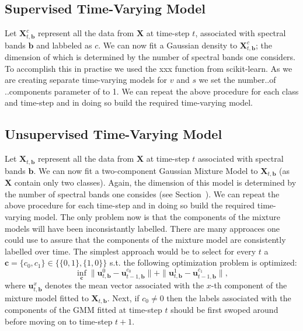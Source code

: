 \documentclass{article}
\begin{document}
\subsection{Supervised Time-Varying Model}
Let $\mathbf{X}_{t,\mathbf{b}}^c$ represent all the data from $\mathbf{X}$ at time-step $t$, associated with spectral bands $\mathbf{b}$ and labbeled as $c$. We can now fit a Gaussian density 
to $\mathbf{X}_{t,\mathbf{b}}^c$; the dimension of which is determined by the number of spectral bands one considers. To accomplish this in practise we used the xxx function from scikit-learn. 
As we are creating separate time-varying models for $v$ and $s$ we set the number..of ..components parameter of to 1. We can repeat the above procedure for each class and time-step and in 
doing so build the required time-varying model.

\subsection{Unsupervised Time-Varying Model}
Let $\mathbf{X}_{t,\mathbf{b}}$ represent all the data from $\mathbf{X}$ at time-step $t$ associated with spectral bands $\mathbf{b}$. We can now fit a two-component Gaussian Mixture Model to $\mathbf{X}_{t,\mathbf{b}}$ (as $\mathbf{X}$ contain only two classes). Again,
the dimension of this model is determined by the number of spectral bands one consides (see Section~). We can repeat the above procedure for each time-step and in doing so 
build the required time-varying model. The only problem now is that the components of the mixture models will have been inconsistantly labelled. There are many approaces one could use to assure 
that the components of the mixture model are consistently labelled over time. The simplest approach would be to select for every $t$ a $\mathbf{c} = \{c_0,c_1\}\in\{\{0,1\},\{1,0\}\}$ s.t. the following optimization problem is optimized:
\begin{equation}
\inf_{\mathbf{c}} \|\mathbf{u}_{t,\mathbf{b}}^{0}-\mathbf{u}_{t-1,\mathbf{b}}^{c_0}\| + \|\mathbf{u}_{t,\mathbf{b}}^{1}-\mathbf{u}_{t-1,\mathbf{b}}^{c_1}\|,  
\end{equation}
where $\mathbf{u}_{t,\mathbf{b}}^{x}$ denotes the mean vector associated with the $x$-th component of the mixture model fitted to $\mathbf{X}_{t,\mathbf{b}}$.
Next, if $c_0 \neq 0$ then the labels associated with the components of the GMM fitted at time-step $t$ should be first swoped around before moving on to time-step $t+1$.
\end{document}
